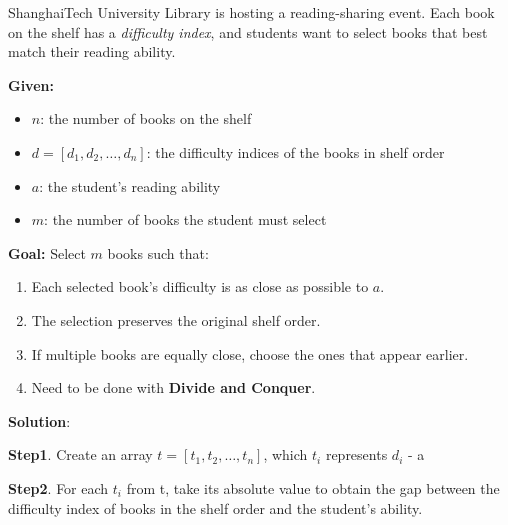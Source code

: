 \problem{}
    ShanghaiTech University Library is hosting a reading-sharing event. 
    Each book on the shelf has a \textit{difficulty index}, and students want to select books that best match their reading ability.
    \vspace{1\baselineskip}

    \noindent\textbf{Given:}
    \begin{itemize}
        \item $n$: the number of books on the shelf
        \item $d = [d_1, d_2, \dots, d_n]$: the difficulty indices of the books in shelf order
        \item $a$: the student's reading ability
        \item $m$: the number of books the student must select
    \end{itemize}

    \noindent\textbf{Goal:}  
    Select $m$ books such that:
    \begin{enumerate}
        \item Each selected book’s difficulty is as close as possible to $a$.
        \item The selection preserves the original shelf order.
        \item If multiple books are equally close, choose the ones that appear earlier.
        \item Need to be done with \textbf{Divide and Conquer}.
    \end{enumerate}

\noindent \textbf{Solution}:

\noindent \textbf{Step1}.
Create an array $t = [t_1, t_2, \dots, t_n]$, which $t_i$ represents $d_i$ - a

\noindent \textbf{Step2}.
For each $t_i$ from t, take its absolute value to obtain the gap between the difficulty index of books in the shelf order and the student's ability.

